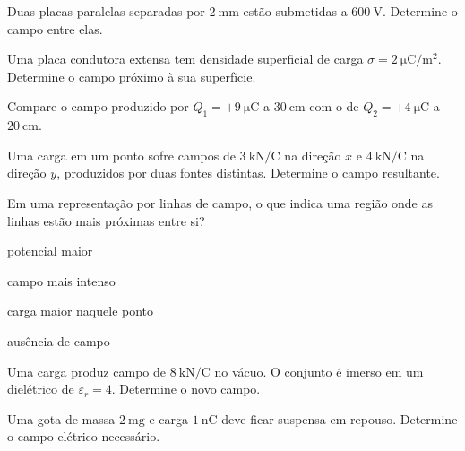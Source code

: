 \begin{questao}[2]{}

Duas placas paralelas separadas por $\SI{2}{\milli\meter}$ estão submetidas a
$\SI{600}{\volt}$. Determine o campo entre elas.


\end{questao}
\begin{questao}[2]{}

Uma placa condutora extensa tem densidade superficial de carga
$\sigma=\SI{2}{\micro\coulomb\per\meter\squared}$. Determine o campo próximo à
sua superfície.


\end{questao}
\begin{questao}[2]{}

Compare o campo produzido por $Q_1=+\SI{9}{\micro\coulomb}$ a
$\SI{30}{\centi\meter}$ com o de $Q_2=+\SI{4}{\micro\coulomb}$ a
$\SI{20}{\centi\meter}$.


\end{questao}
\begin{questao}[2]{}

Uma carga em um ponto sofre campos de $\SI{3}{\kilo\newton\per\coulomb}$ na
direção $x$ e $\SI{4}{\kilo\newton\per\coulomb}$ na direção $y$, produzidos por
duas fontes distintas. Determine o campo resultante.


\end{questao}
\begin{questao}[2]{}

Em uma representação por linhas de campo, o que indica uma região onde as
linhas estão mais próximas entre si?
\begin{alternativas}[2]
\item potencial maior
\item campo mais intenso
\item carga maior naquele ponto
\item ausência de campo
\end{alternativas}


\end{questao}
\begin{questao}[2]{}

Uma carga produz campo de $\SI{8}{\kilo\newton\per\coulomb}$ no vácuo. O
conjunto é imerso em um dielétrico de $\varepsilon_r=4$. Determine o novo campo.


\end{questao}
\begin{questao}[2]{}

Uma gota de massa $\SI{2}{\milli\gram}$ e carga $\SI{1}{\nano\coulomb}$ deve
ficar suspensa em repouso. Determine o campo elétrico necessário.


\end{questao}


